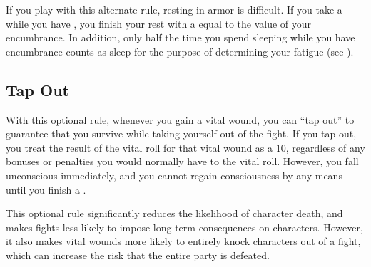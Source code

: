     If you play with this alternate rule, resting in armor is difficult.
    If you take a  while you have , you finish your rest with a  equal to the value of your encumbrance.
    In addition, only half the time you spend sleeping while you have encumbrance counts as sleep for the purpose of determining your fatigue (see ).

  \subsection{Tap Out}
    With this optional rule, whenever you gain a vital wound, you can ``tap out'' to guarantee that you survive while taking yourself out of the fight.
    If you tap out, you treat the result of the vital roll for that vital wound as a 10, regardless of any bonuses or penalties you would normally have to the vital roll.
    However, you fall unconscious immediately, and you cannot regain consciousness by any means until you finish a .

    This optional rule significantly reduces the likelihood of character death, and makes fights less likely to impose long-term consequences on characters.
    However, it also makes vital wounds more likely to entirely knock characters out of a fight, which can increase the risk that the entire party is defeated.
